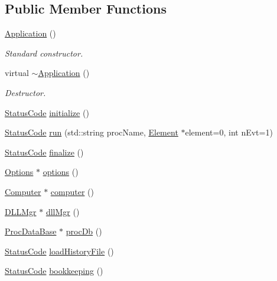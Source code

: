 \subsection*{Public Member Functions}
\begin{DoxyCompactItemize}
\item 
\hyperlink{classApplication_afa8cc05ce6b6092be5ecdfdae44e05f8}{Application} ()
\begin{DoxyCompactList}\small\item\em Standard constructor. \item\end{DoxyCompactList}\item 
virtual \hyperlink{classApplication_a748bca84fefb9c12661cfaa2f623748d}{$\sim$Application} ()
\begin{DoxyCompactList}\small\item\em Destructor. \item\end{DoxyCompactList}\item 
\hyperlink{classStatusCode}{StatusCode} \hyperlink{classApplication_a86b8cbb104f3e04516ef574e5822ff82}{initialize} ()
\item 
\hyperlink{classStatusCode}{StatusCode} \hyperlink{classApplication_a7fdd5bfee44e49896292f8964037384d}{run} (std::string procName, \hyperlink{classElement}{Element} $\ast$element=0, int nEvt=1)
\item 
\hyperlink{classStatusCode}{StatusCode} \hyperlink{classApplication_a5e2b592eebe6f2f8780d2c129bf14560}{finalize} ()
\item 
\hyperlink{classOptions}{Options} $\ast$ \hyperlink{classApplication_ada7cc0e8db586985f1435aee0c79f47d}{options} ()
\item 
\hyperlink{classComputer}{Computer} $\ast$ \hyperlink{classApplication_ac5eb8a8e693d1b93426d7aabc6606d8b}{computer} ()
\item 
\hyperlink{classDLLMgr}{DLLMgr} $\ast$ \hyperlink{classApplication_a0133c161bf55544f268ca039e174060b}{dllMgr} ()
\item 
\hyperlink{classProcDataBase}{ProcDataBase} $\ast$ \hyperlink{classApplication_aa5c28af1a7e1c41dada2db2a4d03c57d}{procDb} ()
\item 
\hyperlink{classStatusCode}{StatusCode} \hyperlink{classApplication_ab5d46fc4784a4c821e974f5a47ec933d}{loadHistoryFile} ()
\item 
\hyperlink{classStatusCode}{StatusCode} \hyperlink{classApplication_ad5faa0fa744706190844bbc4be58b700}{bookkeeping} ()
\item 

\end{DoxyCompactItemize}

